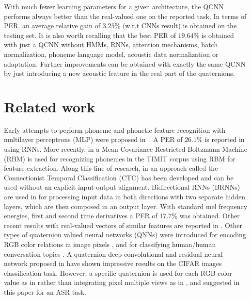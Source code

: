 \documentclass[a4paper]{article}
\begin{document}
With much fewer learning parameters for a given architecture, the QCNN performs always better than the real-valued one on the reported task. In terms of PER, an average relative gain of $3.25$\% (w.r.t CNNs result) is obtained on the testing set. It is also worth recalling that the best PER of $19.64$\% is obtained with just a QCNN without HMMs, RNNs, attention mechanisms, batch normalization, phoneme language model, acoustic data normalization or adaptation. Further improvements can be obtained with exactly the same QCNN by just introducing a new acoustic feature in the real part of the quaternions.




\section{Related work}
Early attempts to perform phoneme and phonetic feature recognition with multilayer perceptrons (MLP) were proposed in~\cite{bourlard1996mew,robinson1994application,bengio1992global}. A PER of $26.1$\% is reported in~\cite{robinson1994application} using RNNs. More recently, in \cite{dahl2010phone} a Mean-Covariance Restricted Boltzmann Machine (RBM) is used for recognizing phonemes in the TIMIT corpus using RBM for feature extraction. Along this line of research, in \cite{graves2006connectionist} an approach called the Connectionist Temporal Classification (CTC) has been developed and can be used without an explicit input-output alignment. 
Bidirectional RNNs (BRNNs) are used in \cite{graves2013speech} for processing input data in both directions with two separate hidden layers, which are then composed in an output layer. With standard mel frequency energies, first and second time derivatives a PER of $17.7$\% was obtained. Other recent results with real-valued vectors of similar features are reported in \cite{chorowski2014end,mirco2017timit,lu2016segmental,lu2017multi}. Other types of quaternion valued neural networks (QNNs) were introduced for encoding RGB color relations in image pixels \cite{hsiao2014edge,chen2015color,garg2017vector}, and for classifying human/human conversation topics \cite{parcollet2017deep,parcollet2017quaternion,parcollet2016quaternion}. A quaternion deep convolutional and residual neural network proposed in \cite{chase2017quat} have shown impressive results on the CIFAR images classification task. However, a specific quaternion is used for each RGB color value as in \cite{chiheb2017complex} rather than integrating pixel multiple views as in \cite{kusamichi2004new}, and suggested in this paper for an ASR task.
\end{document}
